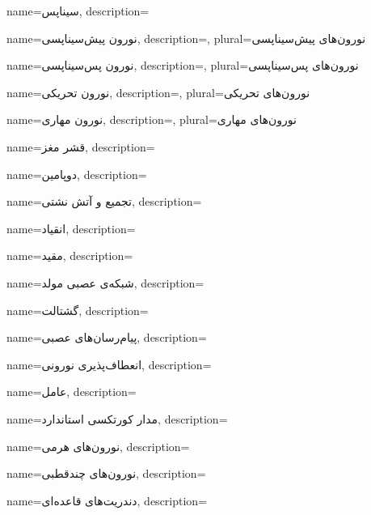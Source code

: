 {
	name={سیناپس},
	description=\hfill{}
}

{
	name={نورون پیش‌سیناپسی},
	description=\hfill{},
    plural={نورون‌های پیش‌سیناپسی}
}

{
	name={نورون پس‌سیناپسی},
	description=\hfill{},
    plural={نورون‌های پس‌سیناپسی}
}

{
	name={نورون تحریکی},
	description=\hfill{},
    plural={نورون‌های تحریکی}
}

{
	name={نورون مهاری},
	description=\hfill{},
    plural={نورون‌های مهاری}
}

{
	name={قشر مغز},
	description=\hfill{}
}

{
    name={دوپامین},
    description=\hfill{}
}

{
    name={تجمیع و آتش نشتی},
    description=\hfill{}
}


{
	name={انقیاد},
	description=\hfill{}
}

{
name={مقید},
description=\hfill{}
}

{
name={شبکه‌ی عصبی مولد},
description=\hfill{}
}

{
	name={گشتالت},
	description=\hfill{}
}

{
	name={پیام‌رسان‌های عصبی},
	description=\hfill{}
}

{
	name={انعطاف‌پذیری نورونی},
	description=\hfill{}
}

{
	name={عامل},
	description=\hfill{}
}

{
	name={مدار کورتکسی استاندارد},
	description=\hfill{}
}

{
	name={نورون‌های هرمی},
	description=\hfill{}
}

{
name={نورون‌های چند‌قطبی},
description=\hfill{}
}

{
name={دندریت‌های قاعده‌ای},
description=\hfill{}
}

